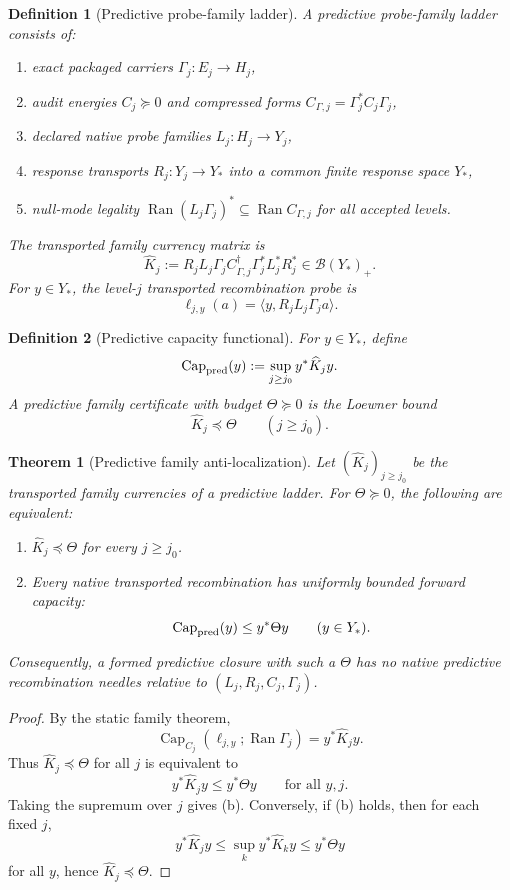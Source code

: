 \documentclass[11pt]{article}
\newtheorem{theorem}{Theorem}
\newtheorem{definition}{Definition}
\newcommand{\Rng}{\operatorname{Ran}}
\newcommand{\Capa}{\operatorname{Cap}}
\begin{document}
\begin{definition}[Predictive probe-family ladder]
A predictive probe-family ladder consists of:
\begin{enumerate}[label=(\roman*)]
\item exact packaged carriers \(\Gamma_j:E_j\to H_j\),
\item audit energies \(C_j\succeq0\) and compressed forms \(C_{\Gamma,j}=\Gamma_j^*C_j\Gamma_j\),
\item declared native probe families \(L_j:H_j\to Y_j\),
\item response transports \(R_j:Y_j\to Y_*\) into a common finite response space \(Y_*\),
\item null-mode legality \(\Rng (L_j\Gamma_j)^*\subseteq\Rng C_{\Gamma,j}\) for all accepted levels.
\end{enumerate}
The transported family currency matrix is
\[
\widehat K_j
:=R_jL_j\Gamma_jC_{\Gamma,j}^{\dagger}\Gamma_j^*L_j^*R_j^*\in\mathcal B(Y_*)_+.
\]
For \(y\in Y_*\), the level-\(j\) transported recombination probe is
\[
\ell_{j,y}(a)=\langle y,R_jL_j\Gamma_j a\rangle.
\]
\end{definition}

\begin{definition}[Predictive capacity functional]
For \(y\in Y_*\), define
\[
\Capa_{\rm pred}(y):=\sup_{j\ge j_0} y^*\widehat K_j y.
\]
A predictive family certificate with budget \(\Theta\succeq0\) is the Loewner bound
\[
\widehat K_j\preceq\Theta\qquad(j\ge j_0).
\]
\end{definition}

\begin{theorem}[Predictive family anti-localization]
Let \((\widehat K_j)_{j\ge j_0}\) be the transported family currencies of a predictive ladder. For \(\Theta\succeq0\), the following are equivalent:
\begin{enumerate}[label=(\alph*)]
\item \(\widehat K_j\preceq\Theta\) for every \(j\ge j_0\).
\item Every native transported recombination has uniformly bounded forward capacity:
\[
\Capa_{\rm pred}(y)\le y^*\Theta y\qquad(y\in Y_*).
\]
\end{enumerate}
Consequently, a formed predictive closure with such a \(\Theta\) has no native predictive recombination needles relative to \((L_j,R_j,C_j,\Gamma_j)\).
\end{theorem}

\begin{proof}
By the static family theorem,
\[
\Capa_{C_j}(\ell_{j,y};\Rng\Gamma_j)=y^*\widehat K_jy.
\]
Thus \(\widehat K_j\preceq\Theta\) for all \(j\) is equivalent to
\[
y^*\widehat K_jy\le y^*\Theta y\qquad\text{for all }y,j.
\]
Taking the supremum over \(j\) gives (b). Conversely, if (b) holds, then for each fixed \(j\),
\[
y^*\widehat K_jy\le \sup_k y^*\widehat K_ky\le y^*\Theta y
\]
for all \(y\), hence \(\widehat K_j\preceq\Theta\).
\end{proof}
\end{document}
